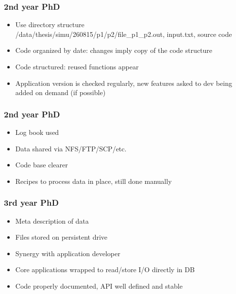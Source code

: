 \documentclass[14pt]{beamer}
\begin{document}
\begin{frame}
\frametitle{2nd year PhD}
\begin{itemize}
\item Use directory structure\\ /data/thesis/simu/260815/p1/p2/file\_p1\_p2.out, input.txt, source code
\item Code organized by date: changes imply copy of the code structure
\item Code structured: reused functions appear
\item Application version is checked regularly, new features asked to dev being added on demand (if possible)
\end{itemize}
\end{frame}
\begin{frame}
\frametitle{2nd year PhD}
\begin{itemize}
\item Log book used
\item Data shared via NFS/FTP/SCP/etc. 
\item Code base clearer 
\item Recipes to process data in place, still done manually
\end{itemize}
\end{frame}

\begin{frame}
\frametitle{3rd year PhD}
\begin{itemize}
\item Meta description of data
\item Files stored on persistent drive
\item Synergy with application developer
\item Core applications wrapped to read/store I/O directly in DB
\item Code properly documented, API well defined and stable
\end{itemize}
\end{frame}
\end{document}
